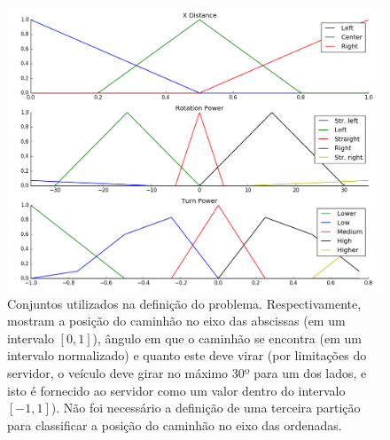 \documentclass{../../sftex/sftex}
\begin{document}
\begin{figure}[ht]
    \centering
    \includegraphics[scale=0.45]{figure_1}
    \caption{Conjuntos utilizados na definição do problema. Respectivamente,
        mostram a posição do caminhão no eixo das abscissas (em um intervalo
        $[0, 1]$), ângulo em que o caminhão se encontra (em um intervalo
        normalizado) e quanto este deve virar (por limitações do servidor, o
        veículo deve girar no máximo 30º para um dos lados, e isto é fornecido
        ao servidor como um valor dentro do intervalo $[-1, 1]$). Não foi
        necessário a definição de uma terceira partição para classificar a
        posição do caminhão no eixo das ordenadas.}\label{fig01}
\end{figure}
\end{document}
